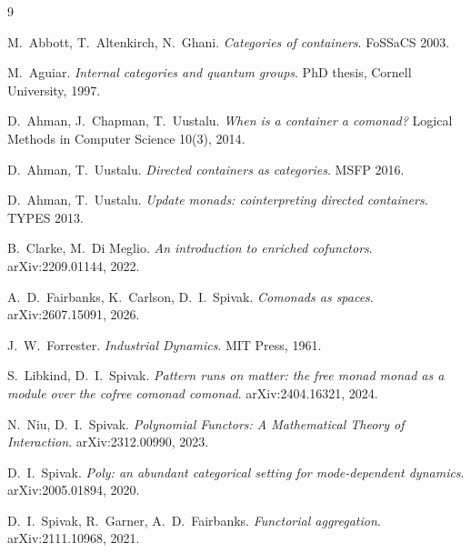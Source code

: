 \documentclass[11pt,a4paper]{article}
\theoremstyle{plain}
\theoremstyle{definition}
\theoremstyle{remark}
\begin{document}
\begin{thebibliography}{9}

M.~Abbott, T.~Altenkirch, N.~Ghani.
\emph{Categories of containers}.
FoSSaCS 2003.

M.~Aguiar.
\emph{Internal categories and quantum groups}.
PhD thesis, Cornell University, 1997.

D.~Ahman, J.~Chapman, T.~Uustalu.
\emph{When is a container a comonad?}
Logical Methods in Computer Science 10(3), 2014.

D.~Ahman, T.~Uustalu.
\emph{Directed containers as categories}.
MSFP 2016.

D.~Ahman, T.~Uustalu.
\emph{Update monads: cointerpreting directed containers}.
TYPES 2013.

B.~Clarke, M.~Di Meglio.
\emph{An introduction to enriched cofunctors}.
arXiv:2209.01144, 2022.

A.~D.~Fairbanks, K.~Carlson, D.~I.~Spivak.
\emph{Comonads as spaces}.
arXiv:2607.15091, 2026.

J.~W.~Forrester.
\emph{Industrial Dynamics}.
MIT Press, 1961.

S.~Libkind, D.~I.~Spivak.
\emph{Pattern runs on matter: the free monad monad as a module over
the cofree comonad comonad}.
arXiv:2404.16321, 2024.

N.~Niu, D.~I.~Spivak.
\emph{Polynomial Functors: A Mathematical Theory of Interaction}.
arXiv:2312.00990, 2023.

D.~I.~Spivak.
\emph{Poly: an abundant categorical setting for mode-dependent
dynamics}.
arXiv:2005.01894, 2020.

D.~I.~Spivak, R.~Garner, A.~D.~Fairbanks.
\emph{Functorial aggregation}.
arXiv:2111.10968, 2021.

\end{thebibliography}
\end{document}
